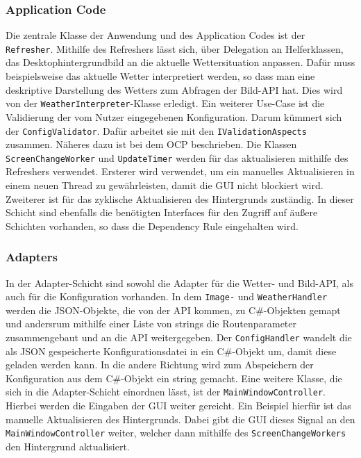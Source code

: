 \subsubsection{Application Code}
Die zentrale Klasse der Anwendung und des Application Codes ist der \texttt{Refresher}. Mithilfe des Refreshers lässt sich, über Delegation an Helferklassen, das Desktophintergrundbild an die aktuelle Wettersituation anpassen. Dafür muss beispielsweise das aktuelle Wetter interpretiert werden, so dass man eine deskriptive Darstellung des Wetters zum Abfragen der Bild-API hat. Dies wird von der \texttt{WeatherInterpreter}-Klasse erledigt. Ein weiterer Use-Case ist die Validierung der vom Nutzer eingegebenen Konfiguration. Darum kümmert sich der \texttt{ConfigValidator}. Dafür arbeitet sie mit den \texttt{IValidationAspects} zusammen. Näheres dazu ist bei dem OCP beschrieben. Die Klassen \texttt{ScreenChangeWorker} und \texttt{UpdateTimer} werden für das aktualisieren mithilfe des Refreshers verwendet. Ersterer wird verwendet, um ein manuelles Aktualisieren in einem neuen Thread zu gewährleisten, damit die GUI nicht blockiert wird. Zweiterer ist für das zyklische Aktualisieren des Hintergrunds zuständig. In dieser Schicht sind ebenfalls die benötigten Interfaces für den Zugriff auf äußere Schichten vorhanden, so dass die Dependency Rule eingehalten wird.
\subsubsection{Adapters}
In der Adapter-Schicht sind sowohl die Adapter für die Wetter- und Bild-API, als auch für die Konfiguration vorhanden. In dem \texttt{Image-} und \texttt{WeatherHandler} werden die JSON-Objekte, die von der API kommen, zu C\#-Objekten gemapt und andersrum mithilfe einer Liste von strings die Routenparameter zusammengebaut und an die API weitergegeben. Der \texttt{ConfigHandler} wandelt die als JSON gespeicherte Konfigurationsdatei in ein C\#-Objekt um, damit diese geladen werden kann. In die andere Richtung wird zum Abspeichern der Konfiguration aus dem C\#-Objekt ein string gemacht. Eine weitere Klasse, die sich in die Adapter-Schicht einordnen lässt, ist der \texttt{MainWindowController}. Hierbei werden die Eingaben der GUI weiter gereicht. Ein Beispiel hierfür ist das manuelle Aktualisieren des Hintergrunds. Dabei gibt die GUI dieses Signal an den \texttt{MainWindowController} weiter, welcher dann mithilfe des \texttt{ScreenChangeWorkers} den Hintergrund aktualisiert.
